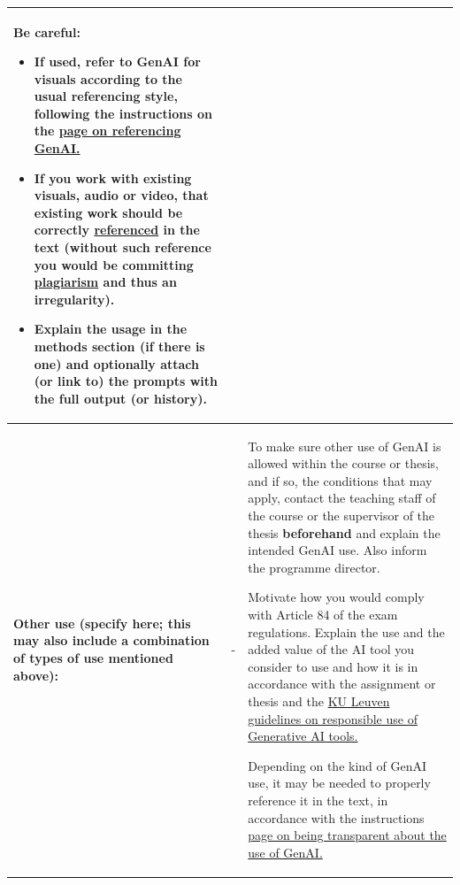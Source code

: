\begin{longtable}{|p{}|p{}|p{}|}
\medskip
\textbf{Be careful:}
\begin{itemize}
    \item If used, refer to GenAI for visuals according to the usual referencing style, following the instructions on the \href{https://bib.kuleuven.be/english/training-and-tutorials/citation/refering-to-genai}{page on referencing GenAI.}
    \item If you work with existing visuals, audio or video, \textbf{that existing work should be correctly \href{https://bib.kuleuven.be/english/training-and-tutorials/citation}{referenced} in the text} (without such reference you would be committing \href{https://www.kuleuven.be/english/education/plagiarism/index}{plagiarism} and thus an irregularity).
    \item Explain the usage in the methods section (if there is one) and optionally attach (or link to) the prompts with the full output (or history).
\end{itemize} \\ \hline
\textbf{Other use (specify here; this may also include a combination of types of use mentioned above):} & - & To make sure other use of GenAI is allowed within the course or thesis, and if so, the conditions that may apply, contact the teaching staff of the course or the supervisor of the thesis \textbf{beforehand} and explain the intended GenAI use. Also inform the programme director. 

\medskip
Motivate how you would comply with Article 84 of the exam regulations. Explain the use and the added value of the AI tool you consider to use and how it is in accordance with the assignment or thesis and the \href{https://www.kuleuven.be/english/genai}{KU Leuven guidelines on responsible use of Generative AI tools.} 

\medskip
Depending on the kind of GenAI use, it may be needed to properly reference it in the text, in accordance with the instructions \href{https://www.kuleuven.be/english/education/student/educational-tools/generative-artificial-intelligence#Transparency}{page on being transparent about the use of GenAI.}\\ \hline
\end{longtable}